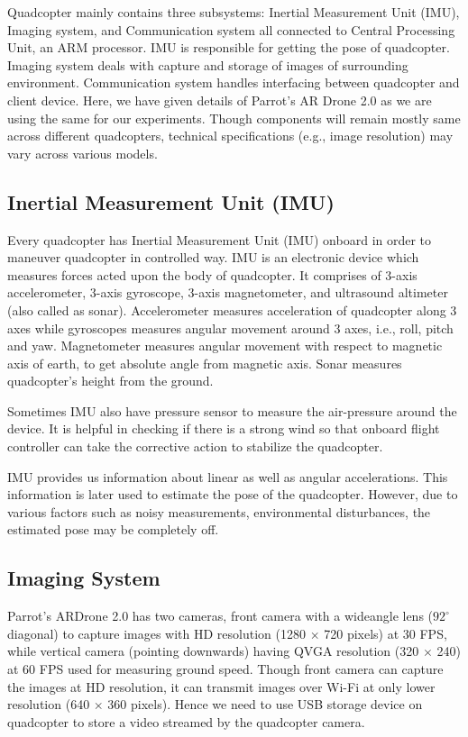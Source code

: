 Quadcopter mainly contains three subsystems: Inertial Measurement Unit (IMU),
Imaging system, and Communication system all connected to Central Processing
Unit, an ARM processor. IMU is responsible for getting the pose of quadcopter.
Imaging system deals with capture and storage of images of surrounding
environment. Communication system handles interfacing between quadcopter and
client device. Here, we have given details of Parrot's AR Drone 2.0 as we are
using the same for our experiments. Though components will remain mostly same across
different quadcopters, technical specifications (e.g., image resolution) may
vary across various models.

\subsection{Inertial Measurement Unit (IMU)}
Every quadcopter has Inertial Measurement Unit (IMU) onboard in order to maneuver
quadcopter in controlled way. IMU is an electronic device which measures forces
acted upon the body of quadcopter. It comprises of 3-axis accelerometer, 3-axis
gyroscope, 3-axis magnetometer, and ultrasound altimeter (also called as sonar).
Accelerometer measures acceleration of quadcopter along 3 axes while gyroscopes
measures angular movement around 3 axes, i.e., roll, pitch and yaw. Magnetometer
measures angular movement with respect to magnetic axis of earth, to get
absolute angle from magnetic axis. Sonar measures quadcopter's
height from the ground.

Sometimes IMU also have pressure sensor to measure the air-pressure around the
device. It is helpful in checking if there is a strong wind so that
onboard flight controller can take the corrective action to stabilize the
quadcopter. 

IMU provides us information about linear as well as angular accelerations. This
information is later used to estimate the pose of the quadcopter. However, due
to various factors such as noisy measurements, environmental disturbances, the
estimated pose may be completely off.
 
\subsection{Imaging System}
Parrot's ARDrone 2.0 has two cameras, front camera with a wideangle lens
($92^{\circ}$ diagonal) to capture images with HD resolution (1280 $\times$ 720
pixels) at 30 FPS, while vertical camera (pointing downwards) having QVGA
resolution (320 $\times$ 240) at 60 FPS used for measuring ground speed.
Though front camera can capture the images at HD resolution, it can transmit
images over Wi-Fi at only  lower resolution (640 $\times$ 360 pixels). Hence we
need to use USB storage device on quadcopter to store a video streamed by the
quadcopter camera. 

